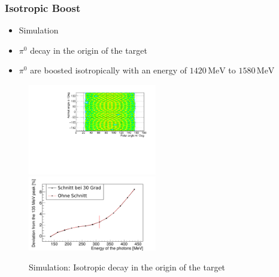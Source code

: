 \documentclass[slidestop,compress,mathserif]{beamer}
\begin{document}
\begin{frame}
	\frametitle{Isotropic Boost}
	\begin{itemize}
		\item Simulation
		\item $\pi^0$ decay in the origin of the target
		\item $\pi^0$ are boosted isotropically with an energy of $ 1420\, \text{MeV}$ to $1580\, \text{MeV}$
	\end{itemize}
	
	\begin{figure}
		\includegraphics[width=0.50\textwidth]{Pictures/20171204DistributionPhotonUrsprungIsotrop}
		\includegraphics[width=0.50\textwidth]{Pictures/20172804IsotropUrpsprungDeviation}
		\caption{Simulation: Isotropic decay in the origin of the target}
	\end{figure}
\end{frame}
\end{document}
